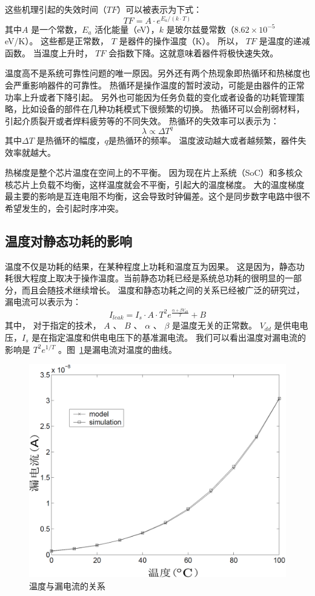 这些机理引起的失效时间（$TF$）可以被表示为下式：
\begin{equation}
TF = A \cdot e^{E_a/(k \cdot T)}
\end{equation}
其中$A$ 是一个常数，$E_a$ 活化能量（eV），$k$ 是玻尔兹曼常数（$8.62 \times 10^{-5}$ eV/K）。
这些都是正常数， $T$ 是器件的操作温度（K）。
所以， $TF$ 是温度的递减函数。
当温度上升时， $TF$ 会指数下降。这就意味着器件将极快速失效。

温度高不是系统可靠性问题的唯一原因。另外还有两个热现象即热循环和热梯度也会严重影响器件的可靠性。
热循环是操作温度的暂时波动，可能是由器件的正常功率上升或者下降引起。
另外也可能因为任务负载的变化或者设备的功耗管理策略，比如设备的部件在几种功耗模式下很频繁的切换。
热循环可以会削弱材料，引起介质裂开或者焊料疲劳等的不同失效。
热循环的失效率可以表示为：
\begin{equation}
\lambda \propto \Delta T^q
\end{equation}
其中$\Delta T$ 是热循环的幅度，$q$是热循环的频率。
温度波动越大或者越频繁，器件失效率就越大。

热梯度是整个芯片温度在空间上的不平衡。
因为现在片上系统（SoC）和多核众核芯片上负载不均衡，这样温度就会不平衡，引起大的温度梯度。
大的温度梯度最主要的影响是互连电阻不均衡，这会导致时钟偏差。这个是同步数字电路中很不希望发生的，会引起时序冲突。

\subsection{温度对静态功耗的影响}\label{sec:leakage}

温度不仅是功耗的结果，在某种程度上功耗和温度互为因果。
这是因为，静态功耗很大程度上取决于操作温度。当前静态功耗已经是系统总功耗的很明显的一部分，而且会随技术继续增长。
温度和静态功耗之间的关系已经被广泛的研究过\cite{liao2005temperature}，漏电流可以表示为：
\begin{equation}
I_{leak} = I_s \cdot A \cdot T^2e^{\frac{\alpha + \beta V_{dd}}{T}}+B
\end{equation}
其中， 对于指定的技术， $A$ 、 $B$ 、  $\alpha$ 、 $\beta$ 是温度无关的正常数。
$V_{dd}$ 是供电电压，$I_s$ 是在指定温度和供电电压下的基准漏电流。
我们可以看出温度对漏电流的影响是 $T^2e^{1/T}$ 。图~\ref{fig:leakage}是漏电流对温度的曲线。
\begin{figure}
  \centering
    \includegraphics[width=0.7\columnwidth]{fig/leakage}
  \caption{温度与漏电流的关系\cite{zhang2003hotleakage}}\label{fig:leakage}
\end{figure}

